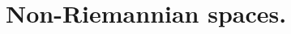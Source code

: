 \setcounter{chapter}{7}
\chapter{Non-Riemannian spaces.}
\pagebreak[4]
\begin{comment}
\section{p283 - Clarification}
\begin{tcolorbox}
$$\mathbf{8.101}\spatie \dv{T^{\rho}}{u} =\dv{T_r}{u}X^{\rho}_{r} + X^{\rho}_{rs}T^r \dv{x^s}{u}$$
\end{tcolorbox}
$T^r$ being a tensor, we have $ T^{\rho} = T^r X^{\rho}{r}$
, giving
\begin{align}
\dv{T^{\rho}}{u} &= X^{\rho}_{r}\dv{T_r}{u} + T^r dv{X^{\rho}_{r}}{u}\\
&= \dv{T_r}{u}X^{\rho}_{r} + T^r X^{\rho}_{rs}\dv{x^s}{u}
\end{align}
$$\blacklozenge$$
\newpage

\section{p284 - Clarification}
\begin{tcolorbox}
..., we immediately see that
$$\fdv{TS^r}{u} = \dv{T}{u} S^r + T \fdv{S^r}{u}$$
\end{tcolorbox}
We have 
\begin{align}
&\left\{\begin{array}{ll}
\fdv{S^r}{u} = \dv{S^r}{u} +\Gamma^r_{mn}S^m\dv{x^n}{u}& \ \\\\
\fdv{TS^r}{u} = \dv{TS^r}{u} +\Gamma^r_{mn}TS^m\dv{x^n}{u}& \ \\
\end{array}\right.\\
\Rightarrow \spatie &\left\{\begin{array}{ll}
T\fdv{S^r}{u} = T\dv{S^r}{u} +\Gamma^r_{mn}TS^m\dv{x^n}{u}&(a)\\\\
\fdv{TS^r}{u} = S^r\dv{T}{u} + T\dv{S^r}{u} +\Gamma^r_{mn}TS^m\dv{x^n}{u}&(b)\\
\end{array}\right.\\
(a)-(b)\Rightarrow\spatie & T \fdv{S^r}{u} - \fdv{TS^r}{u} =-  S^r\dv{T}{u} \\
\Rightarrow\spatie &\fdv{TS^r}{u} = T\fdv{S^r}{u}  +  S^r\dv{T}{u} 
\end{align}
$$\blacklozenge$$
\newpage


\end{comment}
